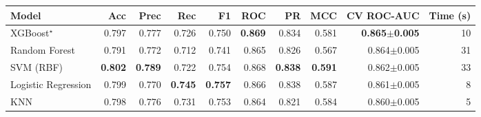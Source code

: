 \scriptsize
\setlength{\tabcolsep}{3pt}
\begin{tabular}{lrrrrrrrrr}
\toprule
Model & Acc & Prec & Rec & F1 & ROC & PR & MCC & CV ROC-AUC & Time (s) \\
\midrule
XGBoost$^\star$ & 0.797 & 0.777 & 0.726 & 0.750 & \textbf{0.869} & 0.834 & 0.581 & \textbf{0.865$\pm$0.005} & 10 \\
Random Forest & 0.791 & 0.772 & 0.712 & 0.741 & 0.865 & 0.826 & 0.567 & 0.864$\pm$0.005 & 31 \\
SVM (RBF) & \textbf{0.802} & \textbf{0.789} & 0.722 & 0.754 & 0.868 & \textbf{0.838} & \textbf{0.591} & 0.862$\pm$0.005 & 33 \\
Logistic Regression & 0.799 & 0.770 & \textbf{0.745} & \textbf{0.757} & 0.866 & 0.838 & 0.587 & 0.861$\pm$0.005 & 8 \\
KNN & 0.798 & 0.776 & 0.731 & 0.753 & 0.864 & 0.821 & 0.584 & 0.860$\pm$0.005 & 5 \\
\bottomrule
\end{tabular}
